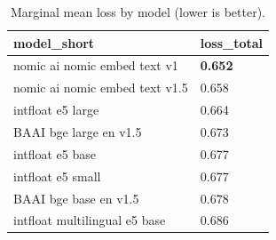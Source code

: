 \begin{table}[t]
\centering
\small
\begin{tabular}{l l}
\toprule
model_short & loss_total \\
\midrule
nomic ai nomic embed text v1 & \textbf{0.652} \\
nomic ai nomic embed text v1.5 & 0.658 \\
intfloat e5 large & 0.664 \\
BAAI bge large en v1.5 & 0.673 \\
intfloat e5 base & 0.677 \\
intfloat e5 small & 0.677 \\
BAAI bge base en v1.5 & 0.678 \\
intfloat multilingual e5 base & 0.686 \\
\bottomrule
\end{tabular}
\caption{Marginal mean loss by model (lower is better).}
\label{tab:marginal_model}
\end{table}